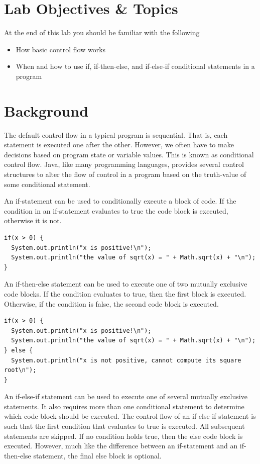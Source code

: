 \documentclass[12pt]{scrartcl}
\begin{document}
\section{Lab Objectives \& Topics}
At the end of this lab you should be familiar with the following
\begin{itemize}
  \item How basic control flow works
  \item When and how to use if, if-then-else, and if-else-if conditional 
  	statements in a program
\end{itemize}

\section{Background}

The default control flow in a typical program is sequential.  That is, 
each statement is executed one after the other.  However, we often 
have to make decisions based on program state or variable values.  
This is known as conditional control flow.  Java, like many programming 
languages, provides several control structures to alter the flow of 
control in a program based on the truth-value of some conditional 
statement.

An if-statement can be used to conditionally execute a block of code.  
If the condition in an if-statement evaluates to true the code block is 
executed, otherwise it is not.

\begin{verbatim}
if(x > 0) {
  System.out.println("x is positive!\n");
  System.out.println("the value of sqrt(x) = " + Math.sqrt(x) + "\n");
}
\end{verbatim}

An if-then-else statement can be used to execute one of two mutually 
exclusive code blocks.  If the condition evaluates to true, then the first 
block is executed.  Otherwise, if the condition is false, the second code 
block is executed. 

\begin{verbatim}
if(x > 0) {
  System.out.println("x is positive!\n");
  System.out.println("the value of sqrt(x) = " + Math.sqrt(x) + "\n");
} else {
  System.out.println("x is not positive, cannot compute its square root\n");
}
\end{verbatim}

An if-else-if statement can be used to execute one of several mutually 
exclusive statements.  It also requires more than one conditional 
statement to determine which code block should be executed.   The 
control flow of an if-else-if statement is such that the first condition that 
evaluates to true is executed.  All subsequent statements are skipped.  
If no condition holds true, then the else code block is executed.  
However, much like the difference between an if-statement and an 
if-then-else statement, the final else block is optional.
\end{document}
